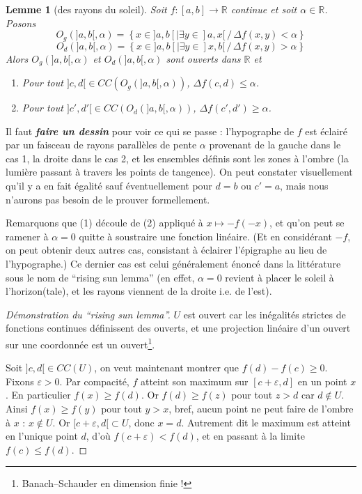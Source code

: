 \documentclass[a4paper, 11pt]{article}
\def\R{\mathbb{R}}
\newtheorem*{lemma}{Lemme}
\begin{document}
\begin{lemma}[des rayons du soleil]
  Soit $f : [a,b] \to \R$ continue et soit $\alpha \in \R$. Posons
  \[ O_g(]a,b[,\alpha)  = \left\{ x \in ]a,b[ | \exists y \in ]a,x[\,/\,
      \Delta f(x,y) < \alpha \right\} \]
  \[ O_d(]a,b[,\alpha) = \left\{ x \in ]a,b[ | \exists y \in ]x,b[\,/\,
      \Delta f(x,y) > \alpha \right\}
  \]
  Alors $O_g(]a,b[,\alpha)$ et $O_d(]a,b[,\alpha)$ sont ouverts dans $\R$ et
  \begin{enumerate}
  \item Pour tout $]c,d[ \in CC(O_g(]a,b[,\alpha))$,
    $\displaystyle \Delta f(c,d) \leq \alpha$.
  \item Pour tout $]c',d'[ \in CC(O_d(]a,b[,\alpha))$,
    $\displaystyle \Delta f(c',d') \geq \alpha$.
  \end{enumerate}
\end{lemma}
Il faut \textit{\textbf{faire un dessin}} pour voir ce qui se passe :
l'hypographe de $f$ est éclairé par un faisceau de rayons parallèles de pente
$\alpha$ provenant de la gauche dans le cas 1, la droite dans le cas 2, et les
ensembles définis sont les zones à l'ombre (la lumière passant à travers les
points de tangence). On peut constater visuellement qu'il y a en fait égalité
sauf éventuellement pour $d = b$ ou $c' = a$, mais nous n'aurons pas besoin de
le prouver formellement.

Remarquons que (1) découle de (2) appliqué à $x \mapsto -f(-x)$, et qu'on peut
se ramener à $\alpha = 0$ quitte à soustraire une fonction linéaire. (Et en
considérant $-f$, on peut obtenir deux autres cas, consistant à éclairer
l'épigraphe au lieu de l'hypographe.) Ce dernier cas est celui généralement
énoncé dans la littérature sous le nom de \enquote{rising sun lemma} (en effet,
$\alpha = 0$ revient à placer le soleil à l'horizon(tale), et les rayons
viennent de la droite i.e. de l'est).

\begin{proof}[Démonstration du \enquote{rising sun lemma}]
  $U$ est ouvert car les inégalités strictes de fonctions continues définissent
  des ouverts, et une projection linéaire d'un ouvert sur une coordonnée
  est un ouvert\footnote{Banach--Schauder en dimension finie !}.

  Soit $]c,d[ \in CC(U)$, on veut maintenant montrer que $f(d) - f(c) \geq 0$.
  Fixons $\varepsilon > 0$. Par compacité, $f$ atteint son maximum sur
  $[c+\varepsilon, d]$ en un point $x$. En particulier $f(x) \geq f(d)$. Or
  $f(d) \geq f(z)$ pour tout $z > d$ car $d \not\in U$. Ainsi $f(x) \geq f(y)$
  pour tout $y > x$, bref, aucun point ne peut faire de l'ombre à $x$ : $x
  \not\in U$. Or $[c+\varepsilon,d[ \subset U$, donc $x = d$. Autrement dit le
  maximum est atteint en l'unique point $d$, d'où $f(c+\varepsilon) < f(d)$, et
  en passant à la limite $f(c) \leq f(d)$.
\end{proof}
\end{document}
